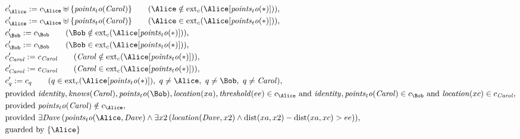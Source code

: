\begin{align*}
&
c'_
{
\Alice
}
 := 
c_
{
\Alice
}
 \uplus 
\{
\mathit{
points_to
}
(
\mathit{Carol}
)
\}
 \qquad (
\Alice
 \notin 
\mathrm{ext}_c(
\Alice
[
\mathit{
points_to
}
(
\ast
)
]
)
)
,\\
&
c'_
{
\Alice
}
 := 
c_
{
\Alice
}
 \uplus 
\{
\mathit{
points_to
}
(
\mathit{Carol}
)
\}
 \qquad (
\Alice
 \in 
\mathrm{ext}_c(
\Alice
[
\mathit{
points_to
}
(
\ast
)
]
)
)
,\\
&
c'_
{
\Bob
}
 := 
c_
{
\Bob
}
 \qquad (
\Bob
 \notin 
\mathrm{ext}_c(
\Alice
[
\mathit{
points_to
}
(
\ast
)
]
)
)
,\\
&
c'_
{
\Bob
}
 := 
c_
{
\Bob
}
 \qquad (
\Bob
 \in 
\mathrm{ext}_c(
\Alice
[
\mathit{
points_to
}
(
\ast
)
]
)
)
,\\
&
c'_
{
\mathit{Carol}
}
 := 
c_
{
\mathit{Carol}
}
 \qquad (
\mathit{Carol}
 \notin 
\mathrm{ext}_c(
\Alice
[
\mathit{
points_to
}
(
\ast
)
]
)
)
,\\
&
c'_
{
\mathit{Carol}
}
 := 
c_
{
\mathit{Carol}
}
 \qquad (
\mathit{Carol}
 \in 
\mathrm{ext}_c(
\Alice
[
\mathit{
points_to
}
(
\ast
)
]
)
)
,\\
&
c'_
q
 := 
c_
q
 \qquad (
q
 \in 
\mathrm{ext}_c(
\Alice
[
\mathit{
points_to
}
(
\ast
)
]
)
,\ 
q \neq 
\Alice
,\ 
q \neq 
\Bob
,\ 
q \neq 
\mathit{Carol}
)
,\\
&
\text{provided } 
\mathit{
identity
}
,
\mathit{
knows
}
(
\mathit{Carol}
)
,
\mathit{
points_to
}
(
\Bob
)
,
\mathit{
location
}
(
xa
)
,
\mathit{
threshold
}
(
ee
)
 \in c_
{
\Alice
}
 \text{ and } 
\mathit{
identity
}
,
\mathit{
points_to
}
(
\mathit{Carol}
)
 \in c_
{
\Bob
}
 \text{ and } 
\mathit{
location
}
(
xc
)
 \in c_
{
\mathit{Carol}
}
,\\
&
\text{provided } 
\mathit{
points_to
}
(
\mathit{Carol}
)
 \notin c_
{
\Alice
}
,\\
&
\text{provided } 
\exists 
\mathit{Dave}
\,(
\mathit{
points_to
}
(
\Alice
,
\mathit{Dave}
)
\land
\exists 
x2
\,(
\mathit{
location
}
(
\mathit{Dave}
,
x2
)
\land
\mathrm{
dist
}(
xa
,
x2
)
-
\mathrm{
dist
}(
xa
,
xc
)
>
ee
)
)
,\\
&
\text{guarded by } \{
\Alice
\}
\end{align*}

